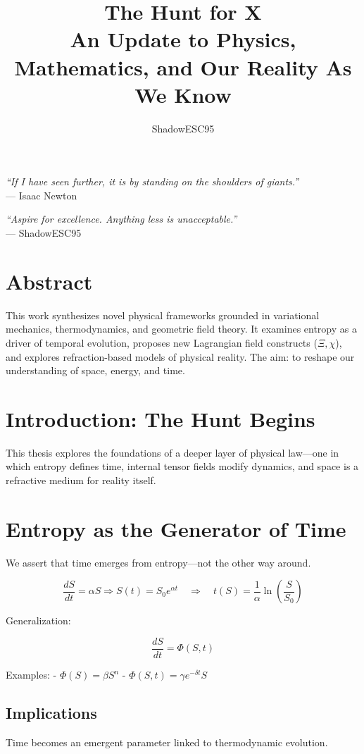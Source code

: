 \documentclass[12pt]{article}
\title{The Hunt for X\\\large An Update to Physics, Mathematics, and Our Reality As We Know}
\author{ShadowESC95}
\date{}
\begin{document}
\maketitle

\begin{center}
\textit{“If I have seen further, it is by standing on the shoulders of giants.”}\\
— Isaac Newton

\vspace{0.5cm}

\textit{“Aspire for excellence. Anything less is unacceptable.”}\\
— ShadowESC95
\end{center}

\section*{Abstract}
This work synthesizes novel physical frameworks grounded in variational mechanics, thermodynamics, and geometric field theory. It examines entropy as a driver of temporal evolution, proposes new Lagrangian field constructs (\(\Xi, \chi\)), and explores refraction-based models of physical reality. The aim: to reshape our understanding of space, energy, and time.

\section{Introduction: The Hunt Begins}
This thesis explores the foundations of a deeper layer of physical law—one in which entropy defines time, internal tensor fields modify dynamics, and space is a refractive medium for reality itself.

\section{Entropy as the Generator of Time}

We assert that time emerges from entropy—not the other way around.

\[
\frac{dS}{dt} = \alpha S \Rightarrow S(t) = S_0 e^{\alpha t}
\quad \Rightarrow \quad t(S) = \frac{1}{\alpha} \ln\left( \frac{S}{S_0} \right)
\]

Generalization:

\[
\frac{dS}{dt} = \Phi(S,t)
\]

Examples:
- \( \Phi(S) = \beta S^n \)
- \( \Phi(S,t) = \gamma e^{-\delta t} S \)

\subsection*{Implications}
Time becomes an emergent parameter linked to thermodynamic evolution.
\end{document}
